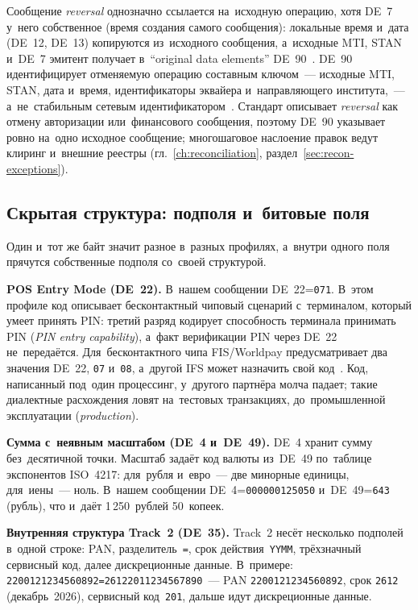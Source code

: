 Сообщение \textit{reversal} однозначно ссылается на~исходную операцию, хотя
DE~7 у~него собственное (время создания самого сообщения): локальные время
и~дата (DE~12, DE~13) копируются из~исходного сообщения, а~исходные MTI, STAN
и~DE~7 эмитент получает в~\enquote{original data elements}
DE~90~\cite{fis-iso8583-guide-2023}.
DE~90 идентифицирует отменяемую операцию составным ключом~--- исходные MTI,
STAN, дата и~время, идентификаторы эквайера и~направляющего института,~---
а~не~стабильным сетевым идентификатором~\cite{iso-8583-2023,jpos-iso8583,nibss-iso8583-1987}.
Стандарт описывает \textit{reversal} как отмену авторизации или~финансового сообщения,
поэтому DE~90 указывает ровно на~одно исходное сообщение; многошаговое
наслоение правок ведут клиринг и~внешние реестры (гл.~\ref{ch:reconciliation},
раздел~\ref{sec:recon-exceptions}).

\subsection*{Скрытая структура: подполя и~битовые поля}

Один и~тот же байт значит разное в~разных профилях, а~внутри одного поля
прячутся собственные подполя со~своей структурой.

\textbf{POS Entry Mode (DE~22).} В~нашем сообщении DE~22=\texttt{071}. В~этом
профиле код описывает бесконтактный чиповый сценарий с~терминалом, который
умеет принять PIN: третий разряд кодирует способность терминала принимать PIN
(\textit{PIN entry capability}), а~факт верификации PIN через DE~22
не~передаётся. Для~бесконтактного чипа FIS/Worldpay предусматривает два значения
DE~22, \texttt{07} и~\texttt{08}, а~другой IFS может назначить
свой код~\cite{fis-iso8583-guide-2023}. Код, написанный под~один
процессинг, у~другого партнёра молча падает; такие диалектные расхождения ловят
на~тестовых транзакциях, до~промышленной эксплуатации (\textit{production}).

\textbf{Сумма с~неявным масштабом (DE~4 и~DE~49).} DE~4 хранит сумму
без~десятичной точки. Масштаб задаёт код валюты из~DE~49 по~таблице
экспонентов ISO~4217: для~рубля и~евро~--- две минорные единицы, для~иены~---
ноль. В~нашем сообщении DE~4=\texttt{000000125050} и~DE~49=\texttt{643}
(рубль), что и~даёт 1\,250~рублей 50~копеек.

\textbf{Внутренняя структура Track~2 (DE~35).} Track~2 несёт несколько подполей
в~одной строке: PAN, разделитель~\texttt{=}, срок действия~\texttt{YYMM},
трёхзначный сервисный код, далее дискреционные данные. В~примере:
\texttt{2200121234560892=26122011234567890}~--- PAN \texttt{2200121234560892},
срок \texttt{2612} (декабрь~2026), сервисный код~\texttt{201}, дальше идут
дискреционные данные.

